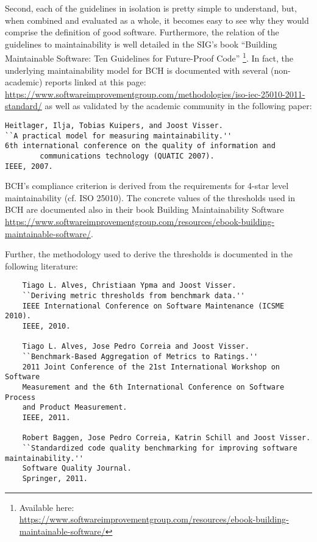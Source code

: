 \documentclass[11pt,fleqn]{article}
\begin{document}
Second, each of the guidelines in isolation is pretty simple to understand, but, when 
combined and evaluated as a whole, it becomes easy to see why 
they would comprise the definition of good software. Furthermore, the relation of the 
guidelines to maintainability is well detailed in the SIG's book ``Building Maintainable 
Software: Ten Guidelines for Future-Proof Code''
\footnote{Available here: \url{https://www.softwareimprovementgroup.com/resources/ebook-building-maintainable-software/}}.
In fact, the underlying maintainability model for BCH is documented with several
(non-academic) reports linked at this page:
\url{https://www.softwareimprovementgroup.com/methodologies/iso-iec-25010-2011-standard/} as 
well as validated by the academic community in the following paper:

\begin{verbatim}
Heitlager, Ilja, Tobias Kuipers, and Joost Visser. 
``A practical model for measuring maintainability.'' 
6th international conference on the quality of information and 
        communications technology (QUATIC 2007). 
IEEE, 2007.
\end{verbatim}

BCH's compliance criterion is derived from the requirements for 4-star level maintainability (cf. ISO 25010). 
The concrete values of the thresholds used in BCH are documented also in their book Building Maintainability 
Software \url{https://www.softwareimprovementgroup.com/resources/ebook-building-maintainable-software/}.

Further, the methodology used to derive the thresholds is documented in the following 
literature:

\begin{verbatim}
    Tiago L. Alves, Christiaan Ypma and Joost Visser. 
    ``Deriving metric thresholds from benchmark data.'' 
    IEEE International Conference on Software Maintenance (ICSME 2010). 
    IEEE, 2010.

    Tiago L. Alves, Jose Pedro Correia and Joost Visser. 
    ``Benchmark-Based Aggregation of Metrics to Ratings.'' 
    2011 Joint Conference of the 21st International Workshop on Software 
    Measurement and the 6th International Conference on Software Process 
    and Product Measurement. 
    IEEE, 2011.

    Robert Baggen, Jose Pedro Correia, Katrin Schill and Joost Visser. 
    ``Standardized code quality benchmarking for improving software maintainability.'' 
    Software Quality Journal.
    Springer, 2011.

\end{verbatim}
\end{document}
